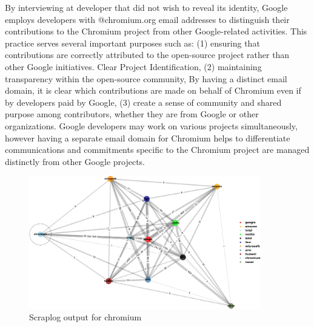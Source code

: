 \documentclass[CHICAGO,Times1COL]{WileyNJDv5} %
\begin{document}
By interviewing at developer that did not wish to reveal its identity, Google employs developers with @chromium.org email addresses to distinguish their contributions to the Chromium project from other Google-related activities. This practice serves several important purposes such as: (1) ensuring that contributions are correctly attributed to the open-source project rather than other Google initiatives. 
Clear Project Identification, (2)  maintaining transparency within the open-source community,  By having a distinct email domain, it is clear which contributions are made on behalf of Chromium even if by developers paid by Google, (3) create a sense of community and shared purpose among contributors, whether they are from Google or other organizations. Google developers may work on various projects simultaneously, however  having a separate email domain for Chromium helps to differentiate communications and commitments specific to the Chromium project are managed distinctly from other Google projects.










\begin{figure}[h]
\centering
\includegraphics[keepaspectratio=true,width=0.9\textwidth]{./Figures/noo/chromium_cropped.pdf}
\caption{Scraplog output for chromium}
\label{fig:chromium}
\end{figure}
\end{document}
